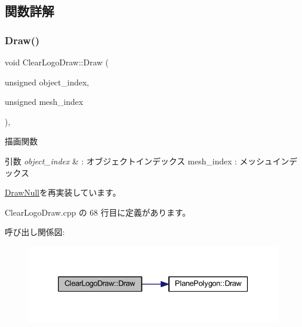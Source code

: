 \subsection{関数詳解}
\mbox{\label{class_clear_logo_draw_ab018f370071f370ae7016d8ee402c456}} 
\subsubsection{\texorpdfstring{Draw()}{Draw()}}
{\footnotesize\ttfamily void Clear\+Logo\+Draw\+::\+Draw (\begin{DoxyParamCaption}\item[{unsigned}]{object\+\_\+index,  }\item[{unsigned}]{mesh\+\_\+index }\end{DoxyParamCaption})\hspace{0.3cm}{\ttfamily [override]}, {\ttfamily [virtual]}}



描画関数 


\begin{DoxyParams}{引数}
{\em object\+\_\+index} & \+: オブジェクトインデックス mesh\+\_\+index \+: メッシュインデックス \\
\hline
\end{DoxyParams}


\mbox{\hyperlink{class_draw_null_afe50f6fd820b18d673f70f048743f339}{Draw\+Null}}を再実装しています。



 Clear\+Logo\+Draw.\+cpp の 68 行目に定義があります。

呼び出し関係図\+:\nopagebreak
\begin{figure}[H]
\begin{center}
\leavevmode
\includegraphics[width=330pt]{class_clear_logo_draw_ab018f370071f370ae7016d8ee402c456_cgraph}
\end{center}
\end{figure}
\mbox{\label{class_clear_logo_draw_a04ae25ae9cb59df0d0c346b65baed3f2}} 
